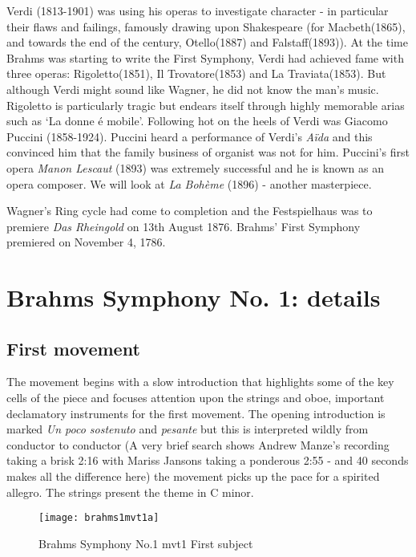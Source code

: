 Verdi (1813-1901) was using his operas to investigate character - in particular their flaws and failings, famously drawing upon Shakespeare (for Macbeth(1865), and towards the end of the century, Otello(1887) and Falstaff(1893)). 
At the time Brahms was starting to write the First Symphony, Verdi had achieved fame with three operas: Rigoletto(1851), Il Trovatore(1853) and La Traviata(1853). But although Verdi might sound like Wagner, he did not know the man's music. Rigoletto is particularly tragic but endears itself through highly memorable arias such as `La donne \'e mobile'. Following hot on the heels of Verdi was Giacomo Puccini (1858-1924). Puccini heard a performance of Verdi's \textit{A\"ida} and this convinced him that the family business of organist was not for him. Puccini's first opera \textit{Manon Lescaut} (1893) was extremely successful and he is known as an opera composer. We will look at \textit{La Boh\`eme} (1896) - another masterpiece. 

Wagner's Ring cycle had come to completion and the Festspielhaus was to premiere \textit{Das Rheingold} on 13th August 1876. Brahms' First Symphony premiered on November 4, 1786. 

\section{Brahms Symphony No. 1: details} 

\subsection{First movement}

The movement begins with a slow introduction that highlights some of the key cells of the piece and focuses attention upon the strings and oboe, important declamatory instruments for the first movement. The opening introduction is marked \textit{Un poco sostenuto} and \textit{pesante} but this is interpreted wildly from conductor to conductor (A very brief search shows Andrew Manze's recording taking a brisk 2:16 with Mariss Jansons taking a ponderous 2:55 - and 40 seconds makes all the difference here) the movement picks up the pace for a spirited allegro. The strings present the theme in C minor.

\begin{figure}[H]
\centering
\texttt{[image: brahms1mvt1a]}\caption{Brahms Symphony No.1 mvt1 First subject}
\label{fig:b1m1first}
\end{figure}


